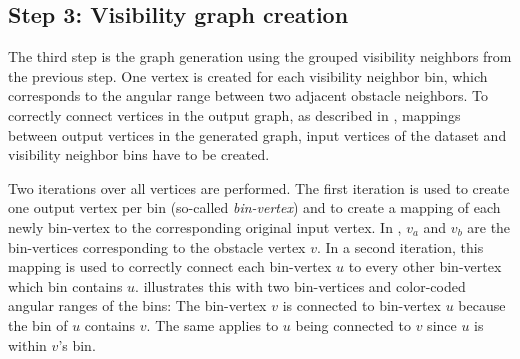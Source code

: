 	\subsection{Step 3: Visibility graph creation}
	\label{subsec:step-3-graph-creation}
	
		The third step is the graph generation using the grouped visibility neighbors from the previous step.
		One vertex is created for each visibility neighbor bin, which corresponds to the angular range between two adjacent obstacle neighbors.
		To correctly connect vertices in the output graph, as described in , mappings between output vertices in the generated graph, input vertices of the dataset and visibility neighbor bins have to be created.
		
		Two iterations over all vertices are performed.
		The first iteration is used to create one output vertex per bin (so-called \emph{bin-vertex}) and to create a mapping of each newly bin-vertex to the corresponding original input vertex.
		In , $v_a$ and $v_b$ are the bin-vertices corresponding to the obstacle vertex $v$.
		In a second iteration, this mapping is used to correctly connect each bin-vertex $u$ to every other bin-vertex which bin contains $u$.
		 illustrates this with two bin-vertices and color-coded angular ranges of the bins:
		The bin-vertex $v$ is connected to bin-vertex $u$ because the bin of $u$ contains $v$.
		The same applies to $u$ being connected to $v$ since $u$ is within $v$'s bin.
		

